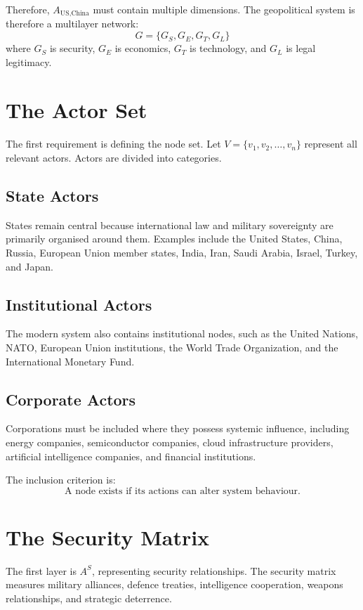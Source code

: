 \documentclass[11pt,openany]{book}
\theoremstyle{plain}
\theoremstyle{definition}
\begin{document}
Therefore, \(A_{\text{US,China}}\) must contain multiple dimensions. The geopolitical system is therefore a multilayer network:
\[
G = \{G_S, G_E, G_T, G_L\}
\]
where \(G_S\) is security, \(G_E\) is economics, \(G_T\) is technology, and \(G_L\) is legal legitimacy.

\section*{The Actor Set}

The first requirement is defining the node set. Let \(V = \{v_1, v_2, \ldots, v_n\}\) represent all relevant actors. Actors are divided into categories.

\subsection*{State Actors}

States remain central because international law and military sovereignty are primarily organised around them. Examples include the United States, China, Russia, European Union member states, India, Iran, Saudi Arabia, Israel, Turkey, and Japan.

\subsection*{Institutional Actors}

The modern system also contains institutional nodes, such as the United Nations, NATO, European Union institutions, the World Trade Organization, and the International Monetary Fund.

\subsection*{Corporate Actors}

Corporations must be included where they possess systemic influence, including energy companies, semiconductor companies, cloud infrastructure providers, artificial intelligence companies, and financial institutions.

The inclusion criterion is:
\[
\boxed{
\text{A node exists if its actions can alter system behaviour.}
}
\]

\section*{The Security Matrix}

The first layer is \(A^S\), representing security relationships. The security matrix measures military alliances, defence treaties, intelligence cooperation, weapons relationships, and strategic deterrence.
\end{document}
